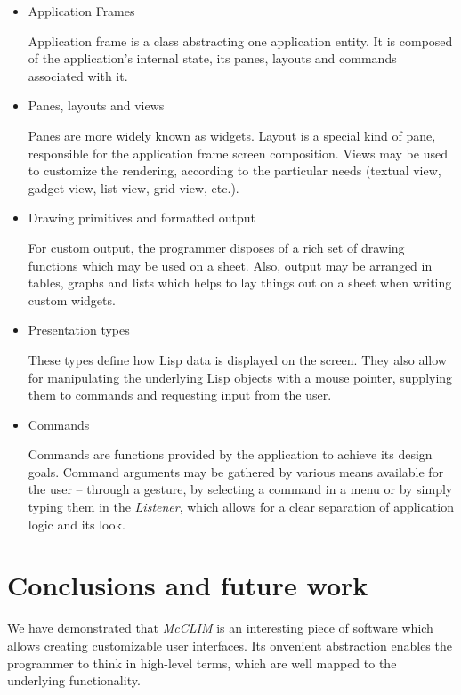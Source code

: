 \documentclass{sig-alternate-05-2015}
\begin{document}
\begin{itemize}
\item Application Frames

  Application frame is a class abstracting one application entity. It
  is composed of the application's internal state, its panes, layouts
  and commands associated with it.

\item Panes, layouts and views

  Panes are more widely known as widgets. Layout is a special kind of
  pane, responsible for the application frame screen composition. Views
  may be used to customize the rendering, according to the particular
  needs (textual view, gadget view, list view, grid view, etc.).

\item Drawing primitives and formatted output

  For custom output, the programmer disposes of a rich set of drawing
  functions which may be used on a sheet. Also, output may be arranged
  in tables, graphs and lists which helps to lay things out on a sheet
  when writing custom widgets.

\item Presentation types

  These types define how Lisp data is displayed on the screen. They
  also allow for manipulating the underlying Lisp objects with a mouse
  pointer, supplying them to commands and requesting input from the user.

\item Commands

  Commands are functions provided by the application to achieve its
  design goals. Command arguments may be gathered by various means
  available for the user – through a gesture, by selecting a command in
  a menu or by simply typing them in the \emph{Listener}\cite{listener},
  which allows for a clear separation of application logic and its look.
\end{itemize}

\section{Conclusions and future work}

We have demonstrated that \emph{McCLIM} is an interesting piece of
software which allows creating customizable user
interfaces. Its onvenient abstraction enables the programmer to think in
high-level terms, which are well mapped to the underlying
functionality.
\end{document}
